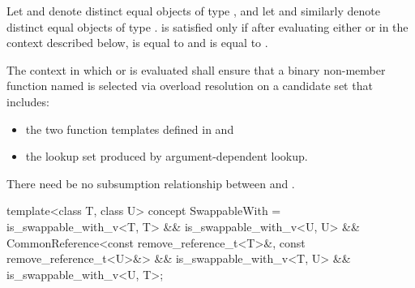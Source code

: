 \begin{itemdescr}
\pnum
Let  and  denote distinct equal objects of type ,
and let  and  similarly denote distinct equal objects of
type .  is satisfied only if after
evaluating either  or  in the context
described below,  is equal to  and  is equal to
.

\pnum
The context in which  or  is evaluated
shall ensure that a binary non-member function named  is selected via
overload resolution on a candidate set that includes:
\begin{itemize}
\item the two  function templates defined in
   and
\item the lookup set produced by argument-dependent
  lookup.
\end{itemize}

\pnum
There need be no subsumption relationship between
and
.
\end{itemdescr}

%
\begin{itemdecl}
template<class T, class U>
  concept SwappableWith =
    is_swappable_with_v<T, T> && is_swappable_with_v<U, U> &&
    CommonReference<const remove_reference_t<T>&, const remove_reference_t<U>&> &&
    is_swappable_with_v<T, U> && is_swappable_with_v<U, T>;
\end{itemdecl}

